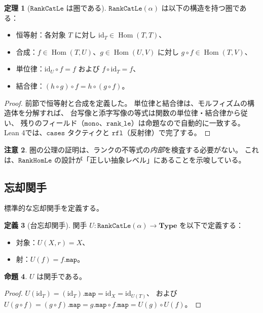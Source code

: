 \documentclass[11pt,a4paper,ja=standard]{bxjsarticle}
\theoremstyle{definition}
\newtheorem{definition}{定義}[section]
\newtheorem{theorem}[definition]{定理}
\newtheorem{proposition}[definition]{命題}
\newtheorem{remark}[definition]{注意}
\newcommand{\Hom}{\operatorname{Hom}}
\newcommand{\Type}{\mathbf{Type}}
\newcommand{\RankHomLe}{\mathtt{RankHomLe}}
\newcommand{\RankCatLe}{\mathtt{RankCatLe}}
\begin{document}
\begin{theorem}[$\RankCatLe$ は圏である]\label{thm:rankcatle-category}
$\RankCatLe(\alpha)$ は以下の構造を持つ圏である：
\begin{itemize}
\item 恒等射：各対象 $T$ に対し $\mathrm{id}_T \in \Hom(T, T)$、
\item 合成：$f \in \Hom(T, U)$、$g \in \Hom(U, V)$ に対し $g \circ f \in \Hom(T, V)$、
\item 単位律：$\mathrm{id}_U \circ f = f$ および $f \circ \mathrm{id}_T = f$、
\item 結合律：$(h \circ g) \circ f = h \circ (g \circ f)$。
\end{itemize}
\end{theorem}

\begin{proof}
前節で恒等射と合成を定義した。
単位律と結合律は、モルフィズムの構造体を分解すれば、
台写像と添字写像の等式は関数の単位律・結合律から従い、
残りのフィールド（$\mathtt{mono}$、$\mathtt{rank\_le}$）は命題なので自動的に一致する。
Lean 4では、$\mathtt{cases}$ タクティクと $\mathtt{rfl}$（反射律）で完了する。
\end{proof}

\begin{remark}
圏の公理の証明は、ランクの不等式の\emph{内部}を検査する必要がない。
これは、$\RankHomLe$ の設計が「正しい抽象レベル」にあることを示唆している。
\end{remark}

\subsection{忘却関手}

標準的な忘却関手を定義する。

\begin{definition}[台忘却関手]
関手 $U : \RankCatLe(\alpha) \to \Type$ を以下で定義する：
\begin{itemize}
\item 対象：$U(X, r) = X$、
\item 射：$U(f) = f.\mathtt{map}$。
\end{itemize}
\end{definition}

\begin{proposition}
$U$ は関手である。
\end{proposition}

\begin{proof}
$U(\mathrm{id}_T) = (\mathrm{id}_T).\mathtt{map} = \mathrm{id}_X = \mathrm{id}_{U(T)}$、
および $U(g \circ f) = (g \circ f).\mathtt{map} = g.\mathtt{map} \circ f.\mathtt{map} = U(g) \circ U(f)$。
\end{proof}
\end{document}
